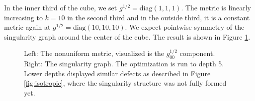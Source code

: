 \documentclass[../thesis.tex]{subfiles}
\begin{document}
In the inner third of the cube, we set $g^{1/2}=\mathrm{diag}(1,1,1)$.
The metric is linearly increasing to $k=10$ in the second third
and in the outside third, it is a constant metric again at $g^{1/2}=\mathrm{diag}(10,10,10)$.
We expect pointwise symmetry of the singularity graph around the center of the cube.
The result is shown in Figure \ref{fig:nonuniform}. 
\begin{figure}[htb]
    \centering
    \def\svgwidth{25em}
    
    \caption{Left: The nonuniform metric, visualized is the $g_{00}^{1/2}$ component. Right: The singularity graph.
    The optimization is run to depth 5. Lower depths displayed similar defects as described in Figure \ref{fig:isotropic}, where
    the singularity structure was not fully formed yet.}
    \label{fig:nonuniform}
\end{figure}
\end{document}
